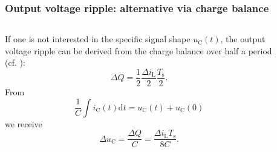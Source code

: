 \begin{frame}
    \frametitle{Output voltage ripple: alternative via charge balance}
    \begin{columns}
        \begin{column}{0.5\textwidth}
            If one is not interested in the specific signal shape $u_\mathrm{C}(t)$, the output voltage ripple can be derived from the charge balance over half a period (cf. ):
            \begin{equation}
                \Delta Q = \frac{1}{2}\frac{\Delta i_\mathrm{L}}{2}\frac{T_\mathrm{s}}{2}.
            \end{equation}
        From $$\frac{1}{C}\int i_\mathrm{C}(t)\mathrm{d}t = u_\mathrm{C}(t) + u_\mathrm{C}(0)$$
        we receive
        \begin{equation}
                \Delta u_\mathrm{C} = \frac{\Delta Q}{C} = \frac{\Delta i_\mathrm{L}T_\mathrm{s}}{8C}.
        \end{equation}
        \end{column}
        \begin{column}{0.5\textwidth}
            \begin{figure}
\end{figure}
\end{column}
\end{columns}
\end{frame}
